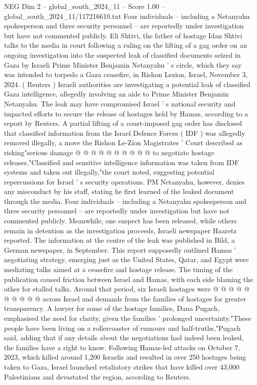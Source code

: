 \begin{textsample}{NEG Dim 2 – global\_south\_2024\_11 – Score 1.00 – global\_south\_2024\_11/117216610.txt}  \label{ex:f2_neg_202}
Four individuals -- including a Netanyahu spokesperson and three security personnel -- are reportedly under investigation but have not commented publicly.
Eli Shtivi, the father of hostage Idan Shtivi talks to the media in court following a ruling on the lifting of a gag order on an ongoing investigation into the suspected leak of classified documents seized in Gaza by Israeli Prime Minister Benjamin Netanyahu ' s circle, which they say was intended to torpedo a Gaza ceasefire, in Rishon Lezion, Israel, November 3, 2024. ( Reuters ) Israeli authorities are investigating a potential leak of classified Gaza intelligence, allegedly involving an aide to Prime Minister Benjamin Netanyahu.
The leak may have compromised Israel ' s national security and impacted efforts to secure the release of hostages held by Hamas, according to a report by Reuters.
A partial lifting of a court-imposed gag order has disclosed that classified information from the Israel Defence Forces ( IDF ) was allegedly removed illegally, a move the Rishon Le-Zion Magistrates ' Court described as risking"serious damage @ @ @ @ @ @ @ @ @ @ to negotiate hostage releases."Classified and sensitive intelligence information was taken from IDF systems and taken out illegally,"the court noted, suggesting potential repercussions for Israel ' s security operations.
PM Netanyahu, however, denies any misconduct by his staff, stating he first learned of the leaked document through the media.
Four individuals -- including a Netanyahu spokesperson and three security personnel -- are reportedly under investigation but have not commented publicly.
Meanwhile, one suspect has been released, while others remain in detention as the investigation proceeds, Israeli newspaper Haaretz reported.
The information at the centre of the leak was published in Bild, a German newspaper, in September.
This report supposedly outlined Hamas ' negotiating strategy, emerging just as the United States, Qatar, and Egypt were mediating talks aimed at a ceasefire and hostage release.
The timing of the publication caused friction between Israel and Hamas, with each side blaming the other for stalled talks.
Around that period, six Israeli hostages were @ @ @ @ @ @ @ @ @ @ across Israel and demands from the families of hostages for greater transparency.
A lawyer for some of the hostage families, Dana Pugach, emphasised the need for clarity, given the families ' prolonged uncertainty."These people have been living on a rollercoaster of rumours and half-truths,"Pugach said, adding that if any details about the negotiations had indeed been leaked, the families have a right to know.
Following Hamas-led attacks on October 7, 2023, which killed around 1,200 Israelis and resulted in over 250 hostages being taken to Gaza, Israel launched retaliatory strikes that have killed over 43,000 Palestinians and devastated the region, according to Reuters.

\end{textsample}
